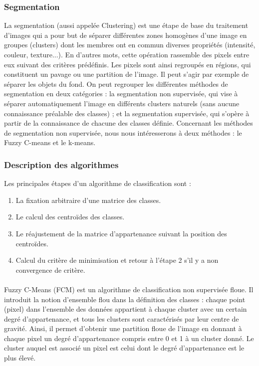 \subsubsection{Segmentation}

La segmentation (aussi appelée Clustering) \cite{d2004etude} est une étape de base du traitement d’images qui a pour but de séparer différentes zones homogènes d’une image en groupes (clusters) dont les membres ont en commun diverses propriétés (intensité, couleur, texture...). En d’autres mots, cette opération rassemble des pixels entre eux suivant des critères prédéfinis. Les pixels sont ainsi regroupés en régions, qui constituent un pavage ou une partition de l'image. Il peut s'agir par exemple de séparer les objets du fond. On peut regrouper les différentes méthodes de segmentation en deux catégories : la segmentation non supervisée, qui vise à séparer automatiquement l’image en différents clusters naturels (sans aucune connaissance préalable des classes) ; et la segmentation supervisée, qui s’opère à partir de la connaissance de chacune des classes définie. Concernant les méthodes de segmentation non supervisée, nous nous intéresserons à deux méthodes : le Fuzzy C-means et le k-means. 

\subsubsection*{Description des algorithmes}
Les principales étapes d'un algorithme de classification sont :
\begin{enumerate}
\item La fixation arbitraire d’une matrice des classes.
\item Le calcul des centroïdes des classes.
\item Le réajustement de la matrice d’appartenance suivant la position des centroïdes.
\item Calcul du critère de minimisation et retour à l’étape 2 s’il y a non convergence de critère.
\end{enumerate}
\paragraph{}

Fuzzy C-Means (FCM) est un algorithme de classification non supervisée floue. Il introduit la notion d’ensemble flou dans la définition des classes : chaque point (pixel) dans l’ensemble des données appartient à chaque cluster avec un certain degré d’appartenance, et tous les clusters sont caractérisés par leur centre de gravité. Ainsi, il permet d’obtenir une partition floue de l’image en donnant à chaque pixel un degré d’appartenance compris entre 0 et 1 à un cluster donné. Le cluster auquel est associé un pixel est celui dont le degré d’appartenance est le plus élevé.

